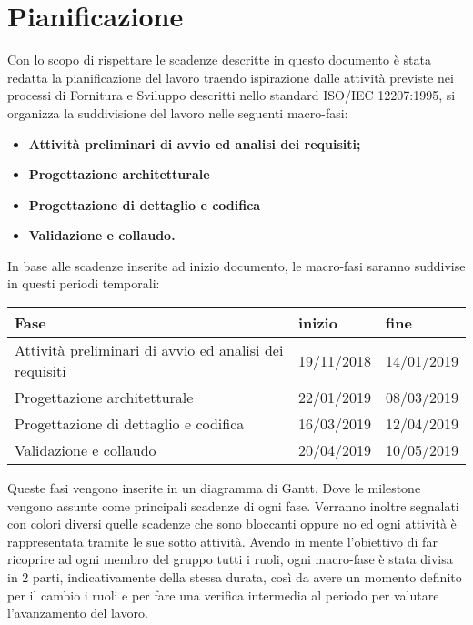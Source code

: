 \section{Pianificazione}

	Con lo scopo di rispettare le scadenze descritte in questo documento è stata redatta la pianificazione del lavoro traendo ispirazione dalle attività previste nei processi di Fornitura e Sviluppo descritti nello standard ISO/IEC 12207:1995, si organizza la suddivisione del lavoro nelle seguenti macro-fasi:
	\begin{itemize}
		\item{\textbf{Attività preliminari di avvio ed analisi dei requisiti;}}
		\item{\textbf{Progettazione architetturale}}
		\item{\textbf{Progettazione di dettaglio e codifica}}
		\item{\textbf{Validazione e collaudo.}}
	\end{itemize} 
	In base alle scadenze inserite ad inizio documento, le macro-fasi saranno suddivise in questi periodi temporali:
	 \newline
	\begin{tabular}{|l|l|l|}
		\hline
		\textbf{Fase} & \textbf{inizio} & \textbf{fine}\\
		\hline
		Attività preliminari di avvio ed analisi dei requisiti & 19/11/2018 & 14/01/2019 \\
		\hline
		Progettazione architetturale & 22/01/2019 & 08/03/2019\\
		\hline
		Progettazione di dettaglio e codifica & 16/03/2019 & 12/04/2019\\
		\hline
		Validazione e collaudo & 20/04/2019 & 10/05/2019\\
		\hline
	\end{tabular}
	\newline
	Queste fasi vengono inserite in un diagramma di Gantt. Dove le milestone vengono assunte come principali scadenze di ogni fase. Verranno inoltre segnalati con colori diversi quelle scadenze che sono bloccanti oppure no ed  ogni attività è rappresentata tramite le sue sotto attività.
\newline Avendo in mente l'obiettivo di far ricoprire ad ogni membro del gruppo tutti i ruoli, ogni macro-fase è stata divisa in 2 parti, indicativamente della stessa durata, così da avere un momento definito per il cambio i ruoli e per fare una verifica intermedia al periodo per valutare l'avanzamento del lavoro. 
	
